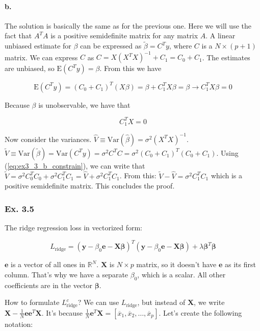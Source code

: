 \documentclass{article}
\begin{document}
\paragraph{b.} The solution is basically the same as for the previous one. Here we will use the fact that $A^TA$ is a positive semidefinite matrix for any matrix $A$. A linear unbiased estimate for $\beta$ can be expressed as $\widetilde{\beta} = C^T y$, where $C$ is a $N \times (p+1)$ matrix. We can express $C$ as $C = X(X^TX)^{-1} + C_1 = C_0 + C_1$. The estimates are unbiased, so $\text{E}(C^Ty) = \beta$. From this we have

\begin{equation}
    \text{E}(C^Ty) = (C_0 + C_1)^T (X\beta) = \beta + C^T_1 X \beta = \beta \to C^T_1 X \beta = 0
\end{equation}

Because $\beta$ is unobservable, we have that

\begin{equation} \label{eq:ex3_3_b_constrain}
    C^T_1 X = 0
\end{equation}

Now consider the variances. $\hat{V} \equiv \text{Var}(\hat{\beta}) = \sigma^2 (X^TX)^{-1}$. $\tilde{V} \equiv \text{Var}(\tilde{\beta}) = \text{Var}(C^Ty) = \sigma^2 C^TC = \sigma^2 (C_0 + C_1)^T (C_0 + C_1)$. Using (\ref{eq:ex3_3_b_constrain}), we can write that $\tilde{V} = \sigma^2 C^T_0 C_0 + \sigma^2 C^T_1 C_1 = \hat{V} + \sigma^2 C^T_1 C_1$. From this: $\tilde{V} - \hat{V} = \sigma^2 C^T_1 C_1$ which is a positive semidefinite matrix. This concludes the proof.

\subsubsection{Ex. 3.5}

The ridge regression loss in vectorized form:

\[
L_{\text{ridge}} = (\mathbf{y} - \beta_0 \mathbf{e} - \mathbf{X}\bm{\beta})^T (\mathbf{y} - \beta_0 \mathbf{e} - \mathbf{X}\bm{\beta}) + \lambda \bm{\beta}^T\bm{\beta}
\]

$\mathbf{e}$ is a vector of all ones in $\mathbb{R}^N$. $\mathbf{X}$ is $N\times p$ matrix, so it doesn't have $\mathbf{e}$ as its first column. That's why we have a separate $\beta_0$, which is a scalar. All other coefficients are in the vector $\bm{\beta}$.

How to formulate $L^c_{\text{ridge}}$? We can use $L_{\text{ridge}}$, but instead of $\mathbf{X}$, we write $\mathbf{X} - \frac{1}{N}\mathbf{e}\mathbf{e}^T\mathbf{X}$. It's because $\frac{1}{N}\mathbf{e}^T\mathbf{X} = [\overline{x}_1, \overline{x}_2, \dots, \overline{x}_p]$. Let's create the following notation:
\end{document}
